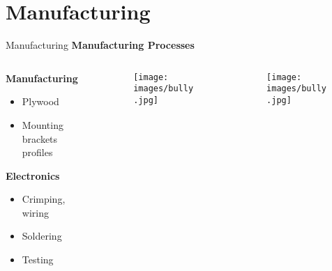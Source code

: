 \documentclass[aspectratio=169]{beamer}
\newcommand{\reducefontsize}{\fontsize{7}{9}\selectfont}
\newcommand{\captionfontsize}{\fontsize{5}{6}\selectfont}
\begin{document}
\section{Manufacturing}

\begin{frame}{Manufacturing}
  \large{\textbf{Manufacturing Processes}}
  \vspace{0.1cm}
         {\reducefontsize  
           \begin{columns}
             \begin{column}{0.3\textwidth}
               \textbf{Manufacturing}
               \begin{itemize}
               \item Plywood 
               \item Mounting brackets profiles
               \end{itemize}
               
               \textbf{Electronics}
               \begin{itemize}
               \item Crimping, wiring
               \item Soldering 
               \item Testing
               \end{itemize}
             \end{column}
             
             \begin{column}{0.3\textwidth}
               {\captionfontsize
                 \begin{figure}
                   \texttt{[image: images/bully.jpg]}
                 \end{figure}
               }
             \end{column}
             \begin{column}{0.3\textwidth}
               \begin{figure}
                 \texttt{[image: images/bully.jpg]}
               \end{figure}
             \end{column}
           \end{columns}

           \vspace{0.20cm}
           
           \begin{columns}
             \begin{column}{0.45\textwidth}
               \centering


\end{column}
\end{columns}}
\end{frame}
\end{document}
